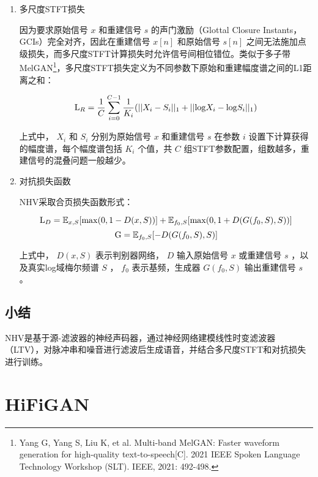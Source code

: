 \documentclass[cn,10pt,math=newtx,citestyle=gb7714-2015,bibstyle=gb7714-2015]{elegantbook}
\begin{document}
\begin{enumerate}
  \item 多尺度STFT损失
  
  因为要求原始信号 $x$ 和重建信号 $s$ 的声门激励（Glottal Closure Instants，GCIs）完全对齐，因此在重建信号 $x[n]$ 和原始信号 $s[n]$ 之间无法施加点级损失，而多尺度STFT计算损失时允许信号间相位错位。类似于多子带MelGAN\footnote{Yang G, Yang S, Liu K, et al. Multi-band MelGAN: Faster waveform generation for high-quality text-to-speech[C]. 2021 IEEE Spoken Language Technology Workshop (SLT). IEEE, 2021: 492-498.}，多尺度STFT损失定义为不同参数下原始和重建幅度谱之间的L1距离之和：

  \begin{equation}
    {\rm L}_R=\frac{1}{C}\sum_{i=0}^{C-1}\frac{1}{K_i}(||X_i-S_i||_1+||{\rm log}X_i-{\rm log}S_i||_1)
  \end{equation}

  上式中， $X_i$ 和 $S_i$ 分别为原始信号 $x$ 和重建信号 $s$ 在参数 $i$ 设置下计算获得的幅度谱，每个幅度谱包括 $K_i$ 个值，共 $C$ 组STFT参数配置，组数越多，重建信号的混叠问题一般越少。

  \item 对抗损失函数
  
  NHV采取合页损失函数形式：

  \begin{equation}
    {\rm L}_D=\mathbb{E}_{x,S}[{\rm max}(0,1-D(x,S))]+\mathbb{E}_{f_0,S}[{\rm max}(0,1+D(G(f_0,S),S))]
  \end{equation}
  \begin{equation}
    {\rm G}=\mathbb{E}_{f_0,S}[-D(G(f_0,S),S)]
  \end{equation}

  上式中， $D(x,S)$ 表示判别器网络， $D$ 输入原始信号 $x$ 或重建信号 $s$ ，以及真实log域梅尔频谱 $S$ ， $f_0$ 表示基频，生成器 $G(f_0,S)$ 输出重建信号 $s$ 。
\end{enumerate}

\subsection{小结}

NHV是基于源-滤波器的神经声码器，通过神经网络建模线性时变滤波器（LTV），对脉冲串和噪音进行滤波后生成语音，并结合多尺度STFT和对抗损失进行训练。

\section{HiFiGAN}
\end{document}
